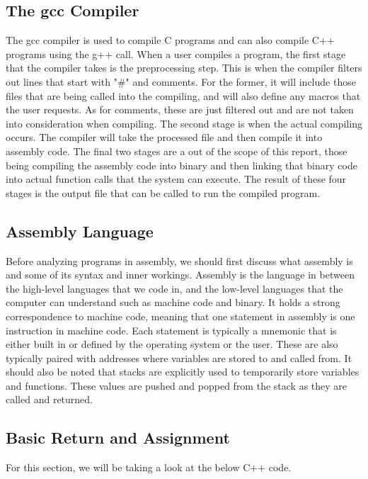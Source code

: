 \documentclass{article}
\theoremstyle{theorem}
\theoremstyle{definition}
\theoremstyle{remark}
\begin{document}
\subsection{The gcc Compiler}

The gcc compiler is used to compile C programs and can also compile C++ programs using the g++ call. When a user compiles a program, the first stage that the compiler takes is the preprocessing step. This is when the compiler filters out lines that start with "\#" and comments. For the former, it will include those files that are being called into the compiling, and will also define any macros that the user requests. As for comments, these are just filtered out and are not taken into consideration when compiling. The second stage is when the actual compiling occurs. The compiler will take the processed file and then compile it into assembly code. The final two stages are a out of the scope of this report, those being compiling the assembly code into binary and then linking that binary code into actual function calls that the system can execute. The result of these four stages is the output file that can be called to run the compiled program.

\subsection{Assembly Language}

Before analyzing programs in assembly, we should first discuss what assembly is and some of its syntax and inner workings. Assembly is the language in between the high-level languages that we code in, and the low-level languages that the computer can understand such as machine code and binary. It holds a strong correspondence to machine code, meaning that one statement in assembly is one instruction in machine code. Each statement is typically a mnemonic that is either built in or defined by the operating system or the user. These are also typically paired with addresses where variables are stored to and called from. It should also be noted that stacks are explicitly used to temporarily store variables and functions. These values are pushed and popped from the stack as they are called and returned.

\subsection{Basic Return and Assignment}

For this section, we will be taking a look at the below C++ code.
\end{document}
